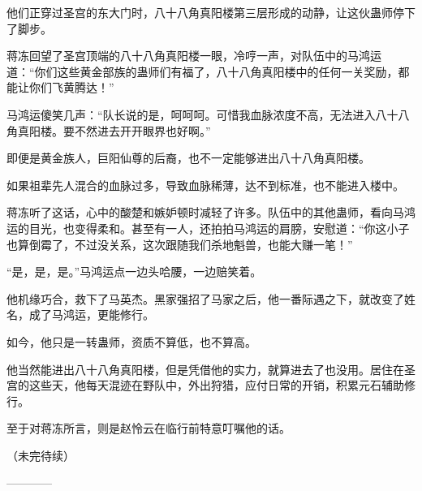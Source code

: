 \begin{this_body}
他们正穿过圣宫的东大门时，八十八角真阳楼第三层形成的动静，让这伙蛊师停下了脚步。

蒋冻回望了圣宫顶端的八十八角真阳楼一眼，冷哼一声，对队伍中的马鸿运道：“你们这些黄金部族的蛊师们有福了，八十八角真阳楼中的任何一关奖励，都能让你们飞黄腾达！”

马鸿运傻笑几声：“队长说的是，呵呵呵。可惜我血脉浓度不高，无法进入八十八角真阳楼。要不然进去开开眼界也好啊。”

即便是黄金族人，巨阳仙尊的后裔，也不一定能够进出八十八角真阳楼。

如果祖辈先人混合的血脉过多，导致血脉稀薄，达不到标准，也不能进入楼中。

蒋冻听了这话，心中的酸楚和嫉妒顿时减轻了许多。队伍中的其他蛊师，看向马鸿运的目光，也变得柔和。甚至有一人，还拍拍马鸿运的肩膀，安慰道：“你这小子也算倒霉了，不过没关系，这次跟随我们杀地魁兽，也能大赚一笔！”

“是，是，是。”马鸿运点一边头哈腰，一边赔笑着。

他机缘巧合，救下了马英杰。黑家强招了马家之后，他一番际遇之下，就改变了姓名，成了马鸿运，更能修行。

如今，他只是一转蛊师，资质不算低，也不算高。

他当然能进出八十八角真阳楼，但是凭借他的实力，就算进去了也没用。居住在圣宫的这些天，他每天混迹在野队中，外出狩猎，应付日常的开销，积累元石辅助修行。

至于对蒋冻所言，则是赵怜云在临行前特意叮嘱他的话。

（未完待续）

------------

\end{this_body}


